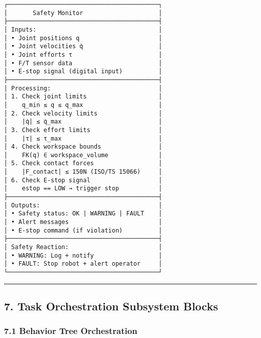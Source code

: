 \documentclass[
]{article}
\begin{document}
\begin{verbatim}
┌──────────────────────────────────────────┐
│       Safety Monitor                     │
├──────────────────────────────────────────┤
│ Inputs:                                  │
│ • Joint positions q                      │
│ • Joint velocities q̇                     │
│ • Joint efforts τ                        │
│ • F/T sensor data                        │
│ • E-stop signal (digital input)          │
├──────────────────────────────────────────┤
│ Processing:                              │
│ 1. Check joint limits                    │
│    q_min ≤ q ≤ q_max                     │
│ 2. Check velocity limits                 │
│    |q̇| ≤ q̇_max                           │
│ 3. Check effort limits                   │
│    |τ| ≤ τ_max                           │
│ 4. Check workspace bounds                │
│    FK(q) ∈ workspace_volume              │
│ 5. Check contact forces                  │
│    |F_contact| ≤ 150N (ISO/TS 15066)     │
│ 6. Check E-stop signal                   │
│    estop == LOW → trigger stop           │
├──────────────────────────────────────────┤
│ Outputs:                                 │
│ • Safety status: OK | WARNING | FAULT    │
│ • Alert messages                         │
│ • E-stop command (if violation)          │
├──────────────────────────────────────────┤
│ Safety Reaction:                         │
│ • WARNING: Log + notify                  │
│ • FAULT: Stop robot + alert operator     │
└──────────────────────────────────────────┘
\end{verbatim}

\begin{center}\rule{0.5\linewidth}{0.5pt}\end{center}

\hypertarget{task-orchestration-subsystem-blocks}{%
\subsection{7. Task Orchestration Subsystem
Blocks}\label{task-orchestration-subsystem-blocks}}

\hypertarget{behavior-tree-orchestration}{%
\subsubsection{7.1 Behavior Tree
Orchestration}\label{behavior-tree-orchestration}}
\end{document}
